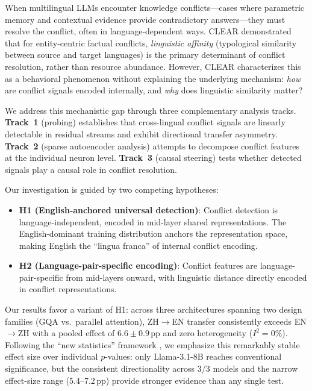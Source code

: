 \documentclass{article}
\begin{document}
When multilingual LLMs encounter knowledge conflicts---cases where parametric memory and contextual evidence provide contradictory answers---they must resolve the conflict, often in language-dependent ways. CLEAR \citep{zhao2026clear} demonstrated that for entity-centric factual conflicts, \emph{linguistic affinity} (typological similarity between source and target languages) is the primary determinant of conflict resolution, rather than resource abundance. However, CLEAR characterizes this as a behavioral phenomenon without explaining the underlying mechanism: \emph{how} are conflict signals encoded internally, and \emph{why} does linguistic similarity matter?

We address this mechanistic gap through three complementary analysis tracks. \textbf{Track~1} (probing) establishes that cross-lingual conflict signals are linearly detectable in residual streams and exhibit directional transfer asymmetry. \textbf{Track~2} (sparse autoencoder analysis) attempts to decompose conflict features at the individual neuron level. \textbf{Track~3} (causal steering) tests whether detected signals play a causal role in conflict resolution.

Our investigation is guided by two competing hypotheses:
\begin{itemize}
    \item \textbf{H1 (English-anchored universal detection)}: Conflict detection is language-independent, encoded in mid-layer shared representations. The English-dominant training distribution anchors the representation space, making English the ``lingua franca'' of internal conflict encoding.
    \item \textbf{H2 (Language-pair-specific encoding)}: Conflict features are language-pair-specific from mid-layers onward, with linguistic distance directly encoded in conflict representations.
\end{itemize}

Our results favor a variant of H1: across three architectures spanning two design families (GQA vs.\ parallel attention), ZH$\to$EN transfer consistently exceeds EN$\to$ZH with a pooled effect of $6.6 \pm 0.9$\,pp and zero heterogeneity ($I^2 = 0\%$). Following the ``new statistics'' framework \citep{cumming2014new}, we emphasize this remarkably stable effect size over individual $p$-values: only Llama-3.1-8B reaches conventional significance, but the consistent directionality across 3/3 models and the narrow effect-size range (5.4--7.2\,pp) provide stronger evidence than any single test.
\end{document}
